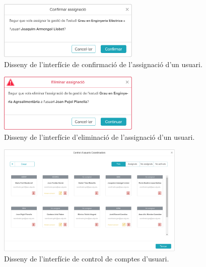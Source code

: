 \documentclass[a4paper,12pt]{ThesisStyle}
\begin{document}
\begin{figure}[H]
	\centering
	\includegraphics[width=0.6\textwidth]{assets/interfaces/administradors/gestCoords/confirmarBox.pdf}
	\caption{\label{img:gestCoords_confirmarBox}Disseny de l'interfície de confirmació de l'assignació d'un usuari.}
\end{figure}

\begin{figure}[H]
	\centering
	\includegraphics[width=0.6\textwidth]{assets/interfaces/administradors/gestCoords/confirmarEsborrarBox.pdf}
	\caption{\label{img:gestCoords_confirmarEsborrarBox}Disseny de l'interfície d'eliminació de l'assignació d'un usuari.}
\end{figure}

\begin{figure}[H]
	\centering
	\includegraphics[width=0.8\textwidth]{assets/interfaces/administradors/gestCoords/gestUsuarisDialog.pdf}
	\caption{\label{img:gestCoords_gestUsuarisDialog}Disseny de l'interfície de control de comptes d'usuari.}
\end{figure}
\end{document}
